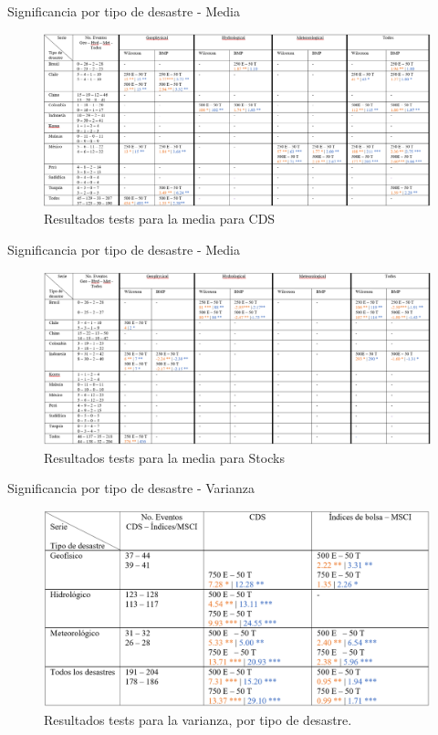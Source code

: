 \documentclass{beamer}
\begin{document}
\begin{frame}{Significancia por tipo de desastre - Media}
    \begin{figure}
        \includegraphics[width=\linewidth]{../Graficos_Paper/Tablas/Media_CDS.png}
        \caption{Resultados tests para la media para CDS}
    \end{figure}
\end{frame}

\begin{frame}{Significancia por tipo de desastre - Media}
    \begin{figure}
        \includegraphics[width=\linewidth]{../Graficos_Paper/Tablas/Media_Stocks.png}
        \caption{Resultados tests para la media para Stocks}
    \end{figure}
\end{frame}

\begin{frame}{Significancia por tipo de desastre - Varianza}
    \begin{figure}
        \includegraphics[width=\linewidth]{../Graficos_Paper/Tablas/Varianza.png}
        \caption{Resultados tests para la varianza, por tipo de desastre.}
    \end{figure}
\end{frame}
\end{document}
